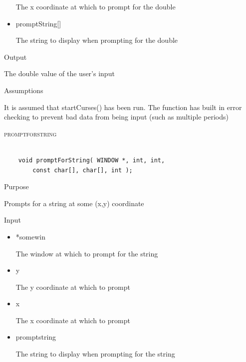 \documentclass[pdftex, 11pt]{article}
\begin{document}
\begin{description}
\begin{description}
\begin{itemize}
						The x coordinate at which to prompt
						for the double

					\item{promptString[]}

						The string to display when prompting for
						the double
						
				\end{itemize}



			\item{Output}

				The double value of the user's input

			\item{Assumptions}

				It is assumed that startCurses() has been run.
				The function has built in error checking to prevent
				bad data from being input (such as multiple periods)

		\end{description}


	\item{\textsc{promptforstring}}

		\begin{lstlisting}

	void promptForString( WINDOW *, int, int, 
		const char[], char[], int );
		\end{lstlisting}

		\begin{description}
			\item{Purpose}

				Prompts for a string at some (x,y) coordinate

			\item{Input}

				\begin{itemize}

					\item{*somewin}

						The window at which to prompt
						for the string

					\item{y}

						The y coordinate at which to prompt

					\item{x}

						The x coordinate at which to prompt

					\item{promptstring}

						The string to display when prompting
						for the string


\end{itemize}
\end{description}
\end{description}
\end{document}
